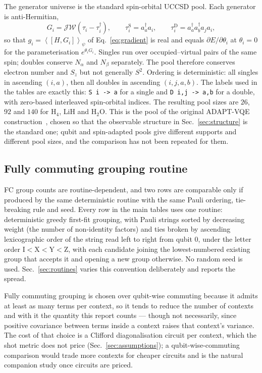 \documentclass[10pt]{article}
\newcommand{\expect}[1]{\left\langle #1 \right\rangle}
\newcommand{\comm}[2]{\left[#1,#2\right]}
\begin{document}
The generator universe is the standard spin-orbital UCCSD pool. Each generator is anti-Hermitian,
\begin{equation}
  G_i=\mathcal{JW}\!\left(\tau_i-\tau_i^\dagger\right),
  \qquad
  \tau_{i}^{\text{S}}=a_a^\dagger a_i,
  \qquad
  \tau_{i}^{\text{D}}=a_a^\dagger a_b^\dagger a_j a_i ,
\end{equation}
so that $g_i=\expect{\comm{H}{G_i}}_\psi$ of Eq.~\eqref{eq:gradient} is real and equals $\partial E/\partial\theta_i$ at $\theta_i=0$ for the parameterisation $e^{\theta_i G_i}$. Singles run over occupied--virtual pairs of the same spin; doubles conserve $N_\alpha$ and $N_\beta$ separately. The pool therefore conserves electron number and $S_z$ but not generally $S^2$. Ordering is deterministic: all singles in ascending $(i,a)$, then all doubles in ascending $(i,j,a,b)$. The labels used in the tables are exactly this: \texttt{S i -> a} for a single and \texttt{D i,j -> a,b} for a double, with zero-based interleaved spin-orbital indices. The resulting pool sizes are $26$, $92$ and $140$ for H$_4$, LiH and H$_2$O. This is the pool of the original ADAPT-VQE construction~\cite{Grimsley2019ADAPT}, chosen so that the observable structure in Sec.~\ref{sec:structure} is the standard one; qubit and spin-adapted pools give different supports and different pool sizes, and the comparison has not been repeated for them.

\subsection{Fully commuting grouping routine}

FC group counts are routine-dependent, and two rows are comparable only if produced by the same deterministic routine with the same Pauli ordering, tie-breaking rule and seed. Every row in the main tables uses one routine: deterministic greedy first-fit grouping, with Pauli strings sorted by decreasing weight (the number of non-identity factors) and ties broken by ascending lexicographic order of the string read left to right from qubit $0$, under the letter order $\mathrm{I}<\mathrm{X}<\mathrm{Y}<\mathrm{Z}$, with each candidate joining the lowest-numbered existing group that accepts it and opening a new group otherwise. No random seed is used. Sec.~\ref{sec:routines} varies this convention deliberately and reports the spread.

Fully commuting grouping is chosen over qubit-wise commuting because it admits at least as many terms per context, so it tends to reduce the number of contexts and with it the quantity this report counts --- though not necessarily, since positive covariance between terms inside a context raises that context's variance. The cost of that choice is a Clifford diagonalisation circuit per context, which the shot metric does not price (Sec.~\ref{sec:assumptions}); a qubit-wise-commuting comparison would trade more contexts for cheaper circuits and is the natural companion study once circuits are priced.
\end{document}
